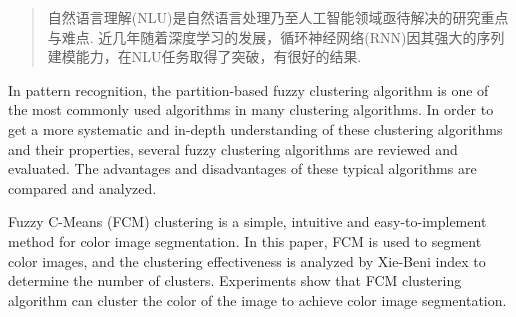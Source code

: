 \documentclass[bachelor,winfonts]{jnuthesis}
\author{胡勇}
\institute{江南大学}
\begin{document}

\maketitle


\begin{abstract}
自然语言理解(NLU)是自然语言处理乃至人工智能领域亟待解决的研究重点与难点.
近几年随着深度学习的发展，循环神经网络(RNN)因其强大的序列建模能力，在NLU任务取得了突破，有很好的结果.

\end{abstract}




\begin{englishabstract}
  In pattern recognition, the partition-based fuzzy clustering algorithm is one of the most commonly used algorithms in many clustering algorithms. In order to get a more systematic and in-depth understanding of these clustering algorithms and their properties, several fuzzy clustering algorithms are reviewed and evaluated. The advantages and disadvantages of these typical algorithms are compared and analyzed.

  Fuzzy C-Means (FCM) clustering is a simple, intuitive and easy-to-implement method for color image segmentation. In this paper, FCM is used to segment color images, and the clustering effectiveness is analyzed by Xie-Beni index to determine the number of clusters. Experiments show that FCM clustering algorithm can cluster the color of the image to achieve color image segmentation.
\end{englishabstract}

\tableofcontents

\mainmatter
\end{document}
